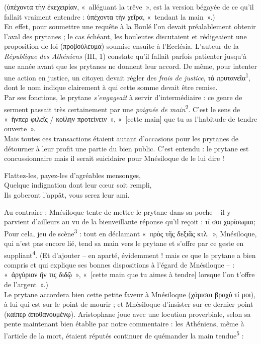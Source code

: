 \documentclass[12pt]{book}%
\newcommand{\italique}[1]{\textit{#1}}%
\newcommand{\citComm}[1]{\begin{quoting}[vskip=0pt] #1 \end{quoting}}%
\newcommand{\marqueur}[1]{\textsuperscript{#1}}%
\newenvironment{groupe}{%
\pstart%
\ledgroup%
}{%
\pend %
}%
\begin{document}
\begin{pages}
\begin{Leftside}
\begin{groupe}
{{(ὑπέχοντα τὴν ἐκεχειρίαν, «~alléguant la trêve~», est la version bégayée de ce qu'il fallait vraiment entendre : ὑπέχοντα τὴν χεῖρα, «~tendant la main~».)\\
En effet, pour soumettre une requête à la Boulé l'on devait préalablement obtenir l'aval des prytanes ; le cas échéant, les bouleutes discutaient et rédigeaient une proposition de loi (προβούλευμα) soumise ensuite à l'Ecclésia. L'auteur de la \italique{République des Athéniens} (III, 1) constate qu'il fallait parfois patienter jusqu'à une année avant que les prytanes ne donnent leur accord.
De même, pour intenter une action en justice, un citoyen devait régler des \italique{frais de justice}, τά πρυτανεῖα\marqueur{1}, dont le nom indique clairement à qui cette somme devait être remise.\\ 
Par ses fonctions, le prytane \italique{s'engageait} à servir d'intermédiaire : ce genre de serment passait très certainement par une \italique{poignée de main}\marqueur{2}.
C'est le sens de «~ἥνπερ φιλεῖς / κοίλην προτείνειν~», «~[cette main] que tu as l'habitude de tendre ouverte~».\\
Mais toutes ces transactions étaient autant d'occasions pour les prytanes de détourner à leur profit une partie du bien public.
C'est entendu : le prytane est concussionnaire mais il serait suicidaire pour Mnésiloque de le lui dire !%
\citComm{Flattez-les, payez-les d'agréables mensonges,\\
Quelque indignation dont leur cœur soit rempli,\\
Ils goberont l'appât, vous serez leur ami.}%
Au contraire : Mnésiloque tente de mettre le prytane dans sa poche -- il y parvient d'ailleurs au vu de la bienveillante réponse qu'il reçoit : τί σοι χαρίσωμαι;\\
Pour cela, jeu de scène\marqueur{3} : tout en déclamant «~πρὸς τῆς δεξιᾶς κτλ.~», Mnésiloque, qui n'est pas encore lié, tend sa main vers le prytane et s'offre par ce geste en suppliant\marqueur{4}. 
(Et d'ajouter -- en aparté, évidemment ! mais ce que le prytane a bien compris et qui explique ses bonnes dispositions à l'égard de Mnésiloque -- : «~ἀργύριον ἤν τις διδῷ~», «~[cette main que tu aimes à tendre] lorsque l'on t'offre de l'argent~».)\\
Le prytane accordera bien cette petite faveur à Mnésiloque (χάρισαι βραχύ τί μοι), à lui qui est sur le point de mourir ; et Mnésiloque d'insister sur ce dernier point (καίπερ ἀποθανουμένῳ).
Aristophane joue avec une locution proverbiale, selon sa pente maintenant bien établie par notre commentaire : les Athéniens, même à l'article de la mort, étaient réputés continuer de quémander la main tendue\marqueur{5} :%
}}
\end{groupe}
\end{Leftside}
\end{pages}
\end{document}
